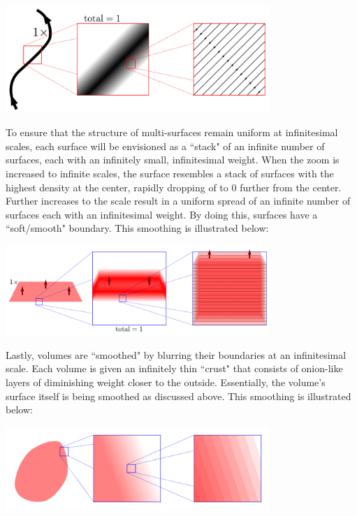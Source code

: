\begin{center}
\includegraphics[width = 0.75\textwidth]{Smoothness_and_duality/path_smoothing}
\end{center}

To ensure that the structure of multi-surfaces remain uniform at infinitesimal scales, each surface will be envisioned as a ``stack" of an infinite number of surfaces, each with an infinitely small, infinitesimal weight. When the zoom is increased to infinite scales, the surface resembles a stack of surfaces with the highest density at the center, rapidly dropping of to \(0\) further from the center. Further increases to the scale result in a uniform spread of an infinite number of surfaces each with an infinitesimal weight. By doing this, surfaces have a ``soft/smooth" boundary. This smoothing is illustrated below:

\begin{center}
\includegraphics[width = 0.75\textwidth]{Smoothness_and_duality/surface_smoothing}
\end{center}

Lastly, volumes are ``smoothed" by blurring their boundaries at an infinitesimal scale. Each volume is given an infinitely thin ``crust" that consists of onion-like layers of diminishing weight closer to the outside. Essentially, the volume's surface itself is being smoothed as discussed above. This smoothing is illustrated below:

\begin{center}
\includegraphics[width = 0.75\textwidth]{Smoothness_and_duality/volume_smoothing}
\end{center}



